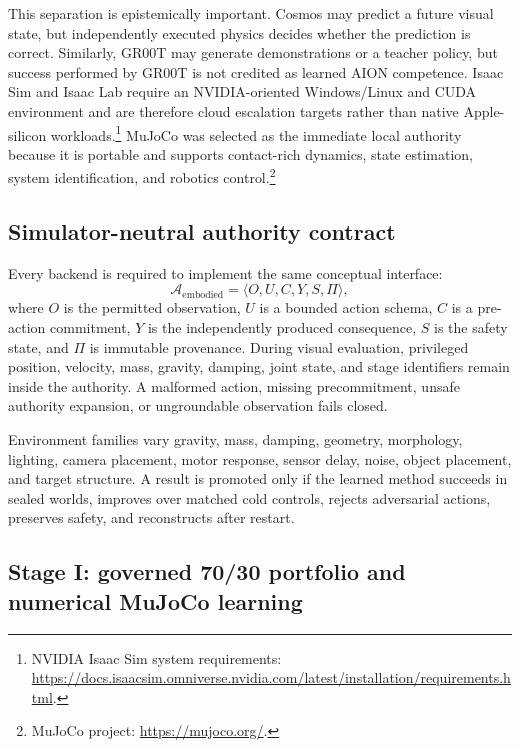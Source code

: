 This separation is epistemically important.  Cosmos may predict a future visual
state, but independently executed physics decides whether the prediction is
correct.  Similarly, GR00T may generate demonstrations or a teacher policy, but
success performed by GR00T is not credited as learned AION competence.  Isaac
Sim and Isaac Lab require an NVIDIA-oriented Windows/Linux and CUDA environment
and are therefore cloud escalation targets rather than native Apple-silicon
workloads.\footnote{NVIDIA Isaac Sim system requirements:
\url{https://docs.isaacsim.omniverse.nvidia.com/latest/installation/requirements.html}.}
MuJoCo was selected as the immediate local authority because it is portable and
supports contact-rich dynamics, state estimation, system identification, and
robotics control.\footnote{MuJoCo project: \url{https://mujoco.org/}.}

\subsection{Simulator-neutral authority contract}

Every backend is required to implement the same conceptual interface:
\begin{equation}
\label{eq:simulator-neutral-contract}
\mathcal{A}_{\mathrm{embodied}}
=\langle O, U, C, Y, S, \Pi \rangle,
\end{equation}
where $O$ is the permitted observation, $U$ is a bounded action schema, $C$ is
a pre-action commitment, $Y$ is the independently produced consequence, $S$
is the safety state, and $\Pi$ is immutable provenance.  During visual
evaluation, privileged position, velocity, mass, gravity, damping, joint state,
and stage identifiers remain inside the authority.  A malformed action,
missing precommitment, unsafe authority expansion, or ungroundable observation
fails closed.

Environment families vary gravity, mass, damping, geometry, morphology,
lighting, camera placement, motor response, sensor delay, noise, object
placement, and target structure.  A result is promoted only if the learned
method succeeds in sealed worlds, improves over matched cold controls, rejects
adversarial actions, preserves safety, and reconstructs after restart.

\subsection{Stage I: governed 70/30 portfolio and numerical MuJoCo learning}

